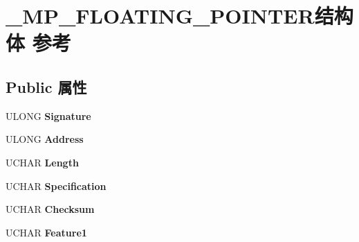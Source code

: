 \hypertarget{struct___m_p___f_l_o_a_t_i_n_g___p_o_i_n_t_e_r}{}\section{\+\_\+\+M\+P\+\_\+\+F\+L\+O\+A\+T\+I\+N\+G\+\_\+\+P\+O\+I\+N\+T\+E\+R结构体 参考}
\label{struct___m_p___f_l_o_a_t_i_n_g___p_o_i_n_t_e_r}
\subsection*{Public 属性}
\begin{DoxyCompactItemize}
\item 
\mbox{\label{struct___m_p___f_l_o_a_t_i_n_g___p_o_i_n_t_e_r_a36389b99867ec9153d60ab113a47acc1}} 
U\+L\+O\+NG {\bfseries Signature}
\item 
\mbox{\label{struct___m_p___f_l_o_a_t_i_n_g___p_o_i_n_t_e_r_a801425f08e49d9f2d98861bf2fda4636}} 
U\+L\+O\+NG {\bfseries Address}
\item 
\mbox{\label{struct___m_p___f_l_o_a_t_i_n_g___p_o_i_n_t_e_r_a5fb2fc5b3ebfa7398275634bd4c16a38}} 
U\+C\+H\+AR {\bfseries Length}
\item 
\mbox{\label{struct___m_p___f_l_o_a_t_i_n_g___p_o_i_n_t_e_r_add24635009b2404ba6623fd7dce8d34d}} 
U\+C\+H\+AR {\bfseries Specification}
\item 
\mbox{\label{struct___m_p___f_l_o_a_t_i_n_g___p_o_i_n_t_e_r_ac21a0d84f96c57014b4a7ad156796063}} 
U\+C\+H\+AR {\bfseries Checksum}
\item 
\mbox{\label{struct___m_p___f_l_o_a_t_i_n_g___p_o_i_n_t_e_r_a703cb3d9d1e790d6d5c7bad4020656e6}} 
U\+C\+H\+AR {\bfseries Feature1}
\item 
\mbox{\label{struct___m_p___f_l_o_a_t_i_n_g___p_o_i_n_t_e_r_a3a2dbd1b9a9a43af3d85281a032a87ed}} 

\end{DoxyCompactItemize}
